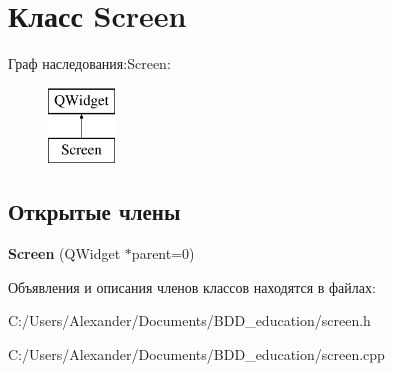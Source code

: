 \hypertarget{class_screen}{}\section{Класс Screen}
\label{class_screen}
Граф наследования\+:Screen\+:\begin{figure}[H]
\begin{center}
\leavevmode
\includegraphics[height=2.000000cm]{class_screen}
\end{center}
\end{figure}
\subsection*{Открытые члены}
\begin{DoxyCompactItemize}
\item 
{\bfseries Screen} (Q\+Widget $\ast$parent=0)\hypertarget{class_screen_a3e359e4d6981f15a0b58c77578d237a5}{}\label{class_screen_a3e359e4d6981f15a0b58c77578d237a5}

\end{DoxyCompactItemize}


Объявления и описания членов классов находятся в файлах\+:\begin{DoxyCompactItemize}
\item 
C\+:/\+Users/\+Alexander/\+Documents/\+B\+D\+D\+\_\+education/screen.\+h\item 
C\+:/\+Users/\+Alexander/\+Documents/\+B\+D\+D\+\_\+education/screen.\+cpp\end{DoxyCompactItemize}
